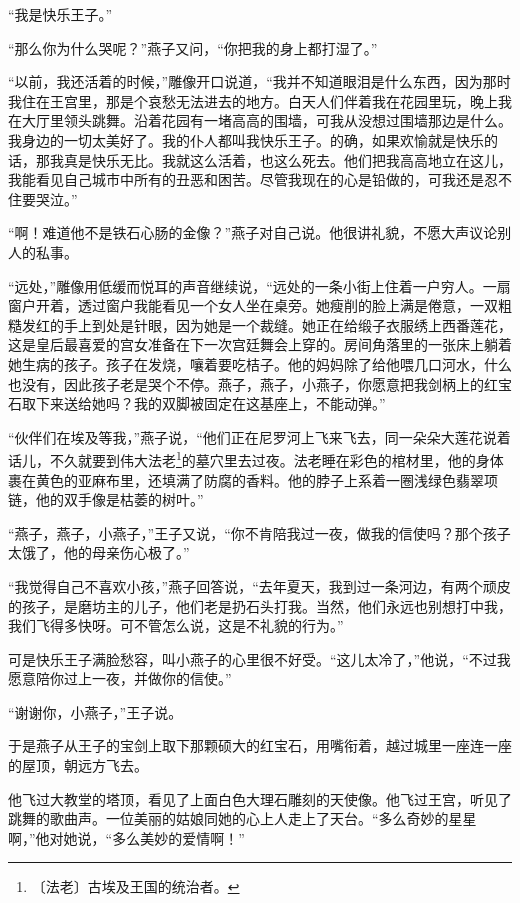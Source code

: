 \documentclass[12pt,UTF-8,openany]{ctexbook}
\begin{document}
\begin{large}
    “我是快乐王子。”
    
    “那么你为什么哭呢？”燕子又问，“你把我的身上都打湿了。”
    
    “以前，我还活着的时候，”雕像开口说道，“我并不知道眼泪是什么东西，因为那时我住在王宫里，那是个哀愁无法进去的地方。白天人们伴着我在花园里玩，晚上我在大厅里领头跳舞。沿着花园有一堵高高的围墙，可我从没想过围墙那边是什么。我身边的一切太美好了。我的仆人都叫我快乐王子。的确，如果欢愉就是快乐的话，那我真是快乐无比。我就这么活着，也这么死去。他们把我高高地立在这儿，我能看见自己城市中所有的丑恶和困苦。尽管我现在的心是铅做的，可我还是忍不住要哭泣。”
    
    “啊！难道他不是铁石心肠的金像？”燕子对自己说。他很讲礼貌，不愿大声议论别人的私事。
    
    “远处，”雕像用低缓而悦耳的声音继续说，“远处的一条小街上住着一户穷人。一扇窗户开着，透过窗户我能看见一个女人坐在桌旁。她瘦削的脸上满是倦意，一双粗糙发红的手上到处是针眼，因为她是一个裁缝。她正在给缎子衣服绣上西番莲花，这是皇后最喜爱的宫女准备在下一次宫廷舞会上穿的。房间角落里的一张床上躺着她生病的孩子。孩子在发烧，嚷着要吃桔子。他的妈妈除了给他喂几口河水，什么也没有，因此孩子老是哭个不停。燕子，燕子，小燕子，你愿意把我剑柄上的红宝石取下来送给她吗？我的双脚被固定在这基座上，不能动弹。”
    
    “伙伴们在埃及等我，”燕子说，“他们正在尼罗河上飞来飞去，同一朵朵大莲花说着话儿，不久就要到伟大法老\footnote{〔法老〕古埃及王国的统治者。}的墓穴里去过夜。法老睡在彩色的棺材里，他的身体裹在黄色的亚麻布里，还填满了防腐的香料。他的脖子上系着一圈浅绿色翡翠项链，他的双手像是枯萎的树叶。”
    
    “燕子，燕子，小燕子，”王子又说，“你不肯陪我过一夜，做我的信使吗？那个孩子太饿了，他的母亲伤心极了。”
    
    “我觉得自己不喜欢小孩，”燕子回答说，“去年夏天，我到过一条河边，有两个顽皮的孩子，是磨坊主的儿子，他们老是扔石头打我。当然，他们永远也别想打中我，我们飞得多快呀。可不管怎么说，这是不礼貌的行为。”
    
    可是快乐王子满脸愁容，叫小燕子的心里很不好受。“这儿太冷了，”他说，“不过我愿意陪你过上一夜，并做你的信使。”
    
    “谢谢你，小燕子，”王子说。
    
    于是燕子从王子的宝剑上取下那颗硕大的红宝石，用嘴衔着，越过城里一座连一座的屋顶，朝远方飞去。
    
    他飞过大教堂的塔顶，看见了上面白色大理石雕刻的天使像。他飞过王宫，听见了跳舞的歌曲声。一位美丽的姑娘同她的心上人走上了天台。“多么奇妙的星星啊，”他对她说，“多么美妙的爱情啊！”
    

\end{large}
\end{document}
